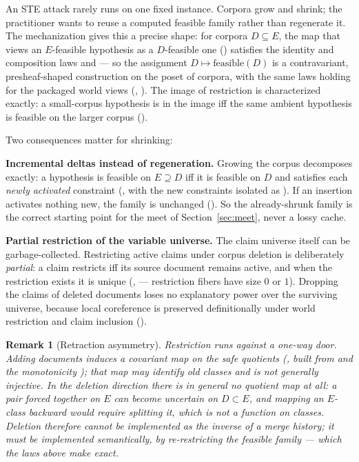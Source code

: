 \documentclass[11pt]{article}
\newtheorem{remark}{Remark}
\begin{document}
An STE attack rarely runs on one fixed instance.  Corpora grow and
shrink; the practitioner wants to reuse a computed feasible family
rather than regenerate it.  The mechanization gives this a precise
shape: for corpora $D\subseteq E$, the map that views an $E$-feasible
hypothesis as a $D$-feasible one () satisfies the
identity and composition laws  and
 --- so the assignment
$D\mapsto\mathrm{feasible}(D)$ is a contravariant, presheaf-shaped
construction on the poset of corpora, with the same laws holding for the
packaged world views (,
).  The image of restriction is characterized
exactly: a small-corpus hypothesis is in the image iff the same ambient
hypothesis is feasible on the larger corpus
().

Two consequences matter for shrinking:

\textbf{Incremental deltas instead of regeneration.}  Growing the corpus
decomposes exactly: a hypothesis is feasible on $E\supseteq D$ iff it is
feasible on $D$ and satisfies each \emph{newly activated} constraint
(, with the new constraints isolated as
).  If an insertion activates nothing new, the
family is unchanged ().  So the
already-shrunk family is the correct starting point for the meet of
Section~\ref{sec:meet}, never a lossy cache.

\textbf{Partial restriction of the variable universe.}  The claim
universe itself can be garbage-collected.  Restricting active claims
under corpus deletion is deliberately \emph{partial}: a claim restricts
iff its source document remains active, and when the restriction exists
it is unique (,
 --- restriction fibers have size $0$ or
$1$).  Dropping the claims of deleted documents loses no explanatory
power over the surviving universe, because local coreference is
preserved definitionally under world restriction and claim inclusion
().

\begin{remark}[Retraction asymmetry]
Restriction runs against a one-way door.  Adding documents induces a
covariant map on the safe quotients (, built from
 and the monotonicity );
that map may identify old classes and is not generally injective.  In
the deletion direction there is in general \emph{no} quotient map at
all: a pair forced together on $E$ can become uncertain on
$D\subset E$, and mapping an $E$-class backward would require splitting
it, which is not a function on classes.  Deletion therefore cannot be
implemented as the inverse of a merge history; it must be implemented
semantically, by re-restricting the feasible family --- which the laws
above make exact.
\end{remark}
\end{document}
